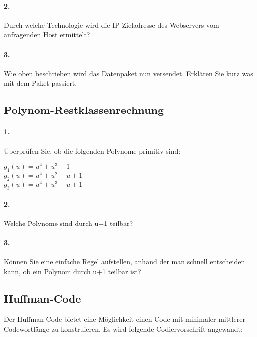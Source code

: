 \documentclass[paper=a4, fontsize=11pt]{scrartcl}
\numberwithin{equation}{section}
\numberwithin{figure}{section}
\numberwithin{table}{section}
\begin{document}
\paragraph{2.}
Durch welche Technologie wird die IP-Zieladresse des Webservers vom anfragenden Host ermittelt? \\

\paragraph{3.}
Wie oben beschrieben wird das Datenpaket nun versendet. Erklären Sie kurz was mit dem Paket passiert.


\subsection{Polynom-Restklassenrechnung}

\paragraph{1.}
Überprüfen Sie, ob die folgenden Polynome primitiv sind:

\begin{center}
$g_{1}(u)=u^{4}+u^{3}+1$ \\
$g_{2}(u)=u^{4}+u^{2}+u+1$ \\
$g_{3}(u)=u^{4}+u^{3}+u+1$ \\
\end{center}

\paragraph{2.}
Welche Polynome sind durch u+1 teilbar? \\

\paragraph{3.}
Können Sie eine einfache Regel aufstellen, anhand der man schnell entscheiden kann, ob ein Polynom durch u+1 teilbar ist? \\


\subsection{Huffman-Code}
Der Huffman-Code bietet eine Möglichkeit einen Code mit minimaler mittlerer Codewortlänge zu konstruieren. Es wird folgende Codiervorschrift angewandt: \\
\end{document}
